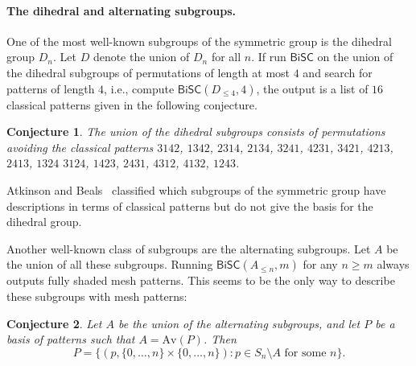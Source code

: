 \documentclass[a4paper]{article}
\newcommand{\bisc}{\mathsf{BiSC}}
\newcommand{\Av}{\mathrm{Av}}
\newtheorem{conjecture}{Conjecture}[theorem]
\begin{document}
\paragraph{The dihedral and alternating subgroups.}
One of the most well-known subgroups of the symmetric group is the dihedral group $D_n$.
Let $D$ denote the union of $D_n$ for all $n$.
If run $\bisc$ on the union of the dihedral subgroups of permutations of length at most $4$
and search for patterns of length $4$, i.e., compute $\bisc(D_{\leq 4},4)$, the output
is a list of $16$ classical patterns given in the following conjecture.
\begin{conjecture} \label{conj:dihedral}
  The union of the dihedral subgroups consists of permutations avoiding the classical
  patterns $3142$, $1342$, $2314$, $2134$, $3241$, $4231$, $3421$, $4213$, $2413$, $1324$
  $3124$, $1423$, $2431$, $4312$, $4132$, $1243$.
\end{conjecture}
Atkinson and Beals~\cite{subgrp} classified which subgroups of the symmetric group have descriptions
in terms of classical patterns but do not give the basis for the dihedral group.

Another well-known class of subgroups are the alternating subgroups. Let $A$ be
the union of all these subgroups. Running $\bisc(A_{\leq n},m)$ for any $n \geq m$
always outputs fully shaded mesh patterns. This seems to be the only way to describe
these subgroups with mesh patterns:
\begin{conjecture} \label{conj:alternating}
  Let $A$ be the union of the alternating subgroups, and let $P$ be a basis of
  patterns such that $A = \Av(P)$. Then
  \[
    P = \{ (p, \{0,\dotsc,n\} \times \{0,\dotsc,n\}) \colon p \in S_n \setminus A \text{ for some } n \}.
  \]
\end{conjecture}
\end{document}
